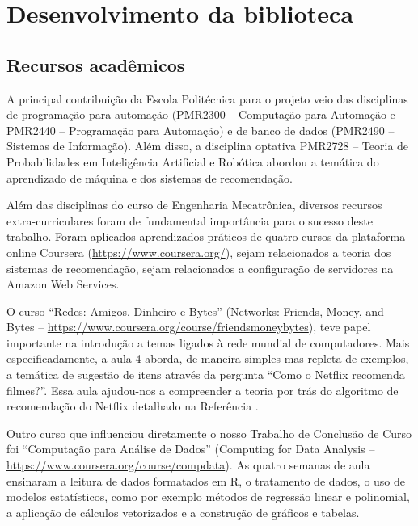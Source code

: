 \chapter{Desenvolvimento da biblioteca} %
\label{cha:desenvolvimento_da_biblioteca}

\section{Recursos acadêmicos} %
\label{sec:recursos_acad_micos}

A principal contribuição da Escola Politécnica para o projeto veio das disciplinas de programação para automação (PMR2300 -- Computação para Automação e PMR2440 -- Programação para Automação) e de banco de dados (PMR2490 -- Sistemas de Informação). Além disso, a disciplina optativa PMR2728 -- Teoria de Probabilidades em Inteligência Artificial e Robótica abordou a temática do aprendizado de máquina e dos sistemas de recomendação.

Além das disciplinas do curso de Engenharia Mecatrônica, diversos recursos extra-curriculares foram de fundamental importância para o sucesso deste trabalho. Foram aplicados aprendizados práticos de quatro cursos da plataforma online Coursera (\url{https://www.coursera.org/}), sejam relacionados a teoria dos sistemas de recomendação, sejam relacionados a configuração de servidores na Amazon Web Services.

O curso ``Redes: Amigos, Dinheiro e Bytes'' (Networks: Friends, Money, and Bytes -- \url{https://www.coursera.org/course/friendsmoneybytes}), teve papel importante na introdução a temas ligados à rede mundial de computadores. Mais especificadamente, a aula 4 aborda, de maneira simples mas repleta de exemplos, a temática de sugestão de itens através da pergunta ``Como o Netflix recomenda filmes?''. Essa aula ajudou-nos a compreender a teoria por trás do algoritmo de recomendação do Netflix detalhado na Referência .


Outro curso que influenciou diretamente o nosso Trabalho de Conclusão de Curso foi ``Computação para Análise de Dados'' (Computing for Data Analysis -- \url{https://www.coursera.org/course/compdata}). As quatro semanas de aula ensinaram a leitura de dados formatados em R, o tratamento de dados, o uso de modelos estatísticos, como por exemplo métodos de regressão linear e polinomial, a aplicação de cálculos vetorizados e a construção de gráficos e tabelas. 

